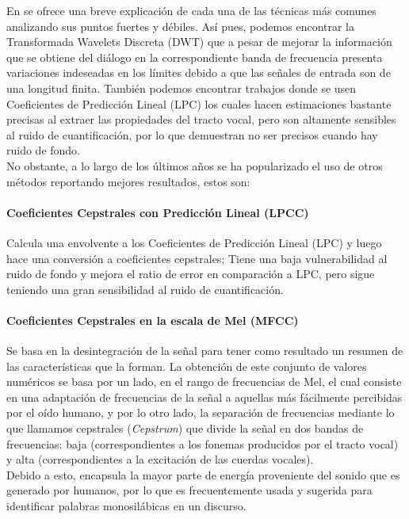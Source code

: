 \documentclass[11pt,a4paper,spanish]{book}
\begin{document}
	En \cite{Rashid2018} se ofrece una breve explicación de cada una de las técnicas más comunes analizando sus puntos fuertes y débiles. Así pues, podemos encontrar la Transformada Wavelets Discreta (DWT) que a pesar de mejorar la información que se obtiene del diálogo en la correspondiente banda de frecuencia presenta variaciones indeseadas en los límites debido a que las señales de entrada son de una longitud finita. También podemos encontrar trabajos donde se usen Coeficientes de Predicción Lineal (LPC) los cuales hacen estimaciones bastante precisas al extraer las propiedades del tracto vocal, pero son altamente sensibles al ruido de cuantificación, por lo que demuestran no ser precisos cuando hay ruido de fondo. \\
	
	No obstante, a lo largo de los últimos años se ha popularizado el uso de otros métodos reportando mejores resultados, estos son:
	
	\paragraph{Coeficientes Cepstrales con Predicción Lineal (LPCC)}
	Calcula una envolvente a los Coeficientes de Predicción Lineal (LPC) y luego hace una conversión a coeficientes cepstrales; Tiene una baja vulnerabilidad al ruido de fondo y mejora el ratio de error en comparación a LPC, pero sigue teniendo una gran sensibilidad al ruido de cuantificación.\hfill \break
	
	\paragraph{Coeficientes Cepstrales en la escala de Mel (MFCC)}
	Se basa en la desintegración de la señal para tener como resultado un resumen de las características que la forman. La obtención de este conjunto de valores numéricos se basa por un lado, en el rango de frecuencias de Mel, el cual consiste en una adaptación de frecuencias de la señal a aquellas más fácilmente percibidas por el oído humano, y por lo otro lado, la separación de frecuencias mediante lo que llamamos cepstrales (\emph{Cepstrum}) que divide la señal en dos bandas de frecuencias: baja (correspondientes a los fonemas producidos por el tracto vocal) y alta (correspondientes a la excitación de las cuerdas vocales). \\
	Debido a esto, encapsula la mayor parte de energía proveniente del sonido que es generado por humanos, por lo que es frecuentemente usada y sugerida para identificar palabras monosilábicas en un discurso.\hfill \break
	
\end{document}
